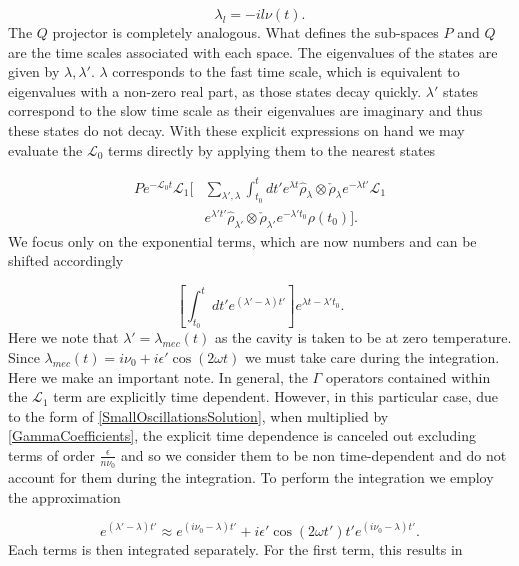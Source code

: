\documentclass[reprint, amsmath,amssymb, aps,pra]{revtex4-1}
\begin{document}
\begin{equation}
\lambda_l = -i l \nu(t).
\end{equation} The $Q$ projector is completely analogous. What defines the sub-spaces $P$ and $Q$ are the time scales associated with each space. The eigenvalues  of the states are given by $\lambda, \lambda'$. $\lambda$ corresponds to the fast time scale, which is equivalent to eigenvalues with a non-zero real part, as those states decay quickly. $\lambda'$ states correspond to the slow time scale as their eigenvalues are imaginary and thus these states do not decay. With these explicit expressions on hand we may evaluate the $\mathcal{L}_0$ terms directly by applying them to the nearest states

\begin{align}\label{ProyectionEQ}
P e^{-\mathcal{L}_0 t}\mathcal{L}_1[&\sum_{\lambda',\lambda}\int_{t_0}^{t}dt'e^{\lambda t} \hat{\rho}_{\lambda} \otimes \check{\rho}_{\lambda}e^{-\lambda t'}\mathcal{L}_1\\
&e^{\lambda' t'}\hat{\rho}_{\lambda'} \otimes \check{\rho}_{\lambda'} e^{-\lambda' t_0}\rho(t_0)]\nonumber.
\end{align} We focus only on the exponential terms, which are now numbers and can be shifted accordingly

\begin{equation}\label{LambdaExponentials}
[\int_{t_0}^t dt' e^{(\lambda'-\lambda)t'}]e^{\lambda t- \lambda't_0}.
\end{equation} Here we note that $\lambda' = \lambda_{mec}(t)$ as the cavity is taken to be at zero temperature. Since $\lambda_{mec}(t) = i\nu_0 + i\epsilon' \cos(2\omega t)$ we must take care during the integration. Here we make an important note. In general, the $\Gamma$ operators contained within the $\mathcal{L}_1$ term are explicitly time dependent. However, in this particular case, due to the form of \eqref{SmallOscillationsSolution}, when multiplied by \eqref{GammaCoefficients}, the explicit time dependence is canceled out excluding terms of order $\frac{\epsilon}{n\nu_0}$ and so we consider them to be non time-dependent and do not account for them during the integration. To perform the integration we employ the approximation

\begin{equation}
e^{(\lambda'-\lambda)t'} \approx e^{(i\nu_0-\lambda)t'} + i\epsilon' \cos(2 \omega t')t' e^{(i\nu_0-\lambda)t'}.
\end{equation} Each terms is then integrated separately. For the first term, this results in
\end{document}

